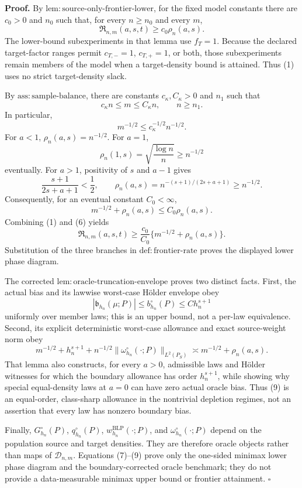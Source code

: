 \textbf{Proof.}
By \(\mathrm{lem:source\text{-}only\text{-}frontier\text{-}lower}\), for the fixed model constants there are \(c_0>0\) and \(n_0\) such that, for every \(n\ge n_0\) and every \(m\),
\[
\mathfrak R_{n,m}(a,s,t)\ge c_0\rho_n(a,s).
\tag{1}
\]
The lower-bound subexperiments in that lemma use \(f_T=1\). Because the declared target-factor ranges permit \(c_{T,-}=1\), \(c_{T,+}=1\), or both, those subexperiments remain members of the model when a target-density bound is attained. Thus (1) uses no strict target-density slack.

By \(\mathrm{ass:sample\text{-}balance}\), there are constants \(c_\kappa,C_\kappa>0\) and \(n_1\) such that
\[
c_\kappa n\le m\le C_\kappa n,
\qquad n\ge n_1.
\tag{2}
\]
In particular,
\[
m^{-1/2}\le c_\kappa^{-1/2}n^{-1/2}.
\tag{3}
\]
For \(a<1\), \(\rho_n(a,s)=n^{-1/2}\). For \(a=1\),
\[
\rho_n(1,s)=\sqrt{\frac{\log n}{n}}\ge n^{-1/2}
\tag{4}
\]
eventually. For \(a>1\), positivity of \(s\) and \(a-1\) gives
\[
\frac{s+1}{2s+a+1}<\frac12,
\qquad
\rho_n(a,s)=n^{-(s+1)/(2s+a+1)}\ge n^{-1/2}.
\tag{5}
\]
Consequently, for an eventual constant \(C_0<\infty\),
\[
m^{-1/2}+\rho_n(a,s)\le C_0\rho_n(a,s).
\tag{6}
\]
Combining (1) and (6) yields
\[
\mathfrak R_{n,m}(a,s,t)
\ge \frac{c_0}{C_0}\{m^{-1/2}+\rho_n(a,s)\}.
\tag{7}
\]
Substitution of the three branches in \(\mathrm{def:frontier\text{-}rate}\) proves the displayed lower phase diagram.

The corrected \(\mathrm{lem:oracle\text{-}truncation\text{-}envelope}\) proves two distinct facts. First, the actual bias and its lawwise worst-case H\"older envelope obey
\[
|\mathfrak b_{h_n}(\mu;P)|\le b_{h_n}^{\circ}(P)\le C h_n^{s+1}
\tag{8}
\]
uniformly over member laws; this is an upper bound, not a per-law equivalence. Second, its explicit deterministic worst-case allowance and exact source-weight norm obey
\[
m^{-1/2}+h_n^{s+1}
+n^{-1/2}\|\omega_{h_n}^{\circ}(\cdot;P)\|_{L^2(P_S)}
\asymp m^{-1/2}+\rho_n(a,s).
\tag{9}
\]
That lemma also constructs, for every \(a>0\), admissible laws and H\"older witnesses for which the boundary allowance has order \(h_n^{s+1}\), while showing why special equal-density laws at \(a=0\) can have zero actual oracle bias. Thus (9) is an equal-order, class-sharp allowance in the nontrivial depletion regimes, not an assertion that every law has nonzero boundary bias.

Finally, \(G_{h_n}^{\circ}(P)\), \(q_{h_n}^{\circ}(P)\), \(w_{h_n}^{\mathrm{BLP}}(\cdot;P)\), and \(\omega_{h_n}^{\circ}(\cdot;P)\) depend on the population source and target densities. They are therefore oracle objects rather than maps of \(\mathcal D_{n,m}\). Equations (7)--(9) prove only the one-sided minimax lower phase diagram and the boundary-corrected oracle benchmark; they do not provide a data-measurable minimax upper bound or frontier attainment. \(\square\)